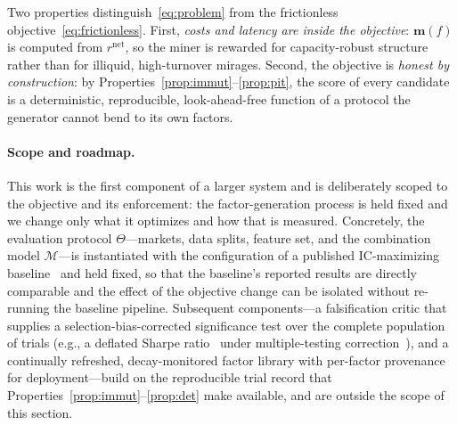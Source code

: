 \documentclass[11pt]{article}
\newcommand{\proto}{\Theta}
\newcommand{\combiner}{\mathcal{M}}
\begin{document}
Two properties distinguish~\eqref{eq:problem} from the frictionless
objective~\eqref{eq:frictionless}. First, \emph{costs and latency are inside the
objective}: $\bm{m}(f)$ is computed from $r^{\mathrm{net}}$, so the miner is rewarded for
capacity-robust structure rather than for illiquid, high-turnover mirages. Second, the
objective is \emph{honest by construction}: by Properties~\ref{prop:immut}--\ref{prop:pit},
the score of every candidate is a deterministic, reproducible, look-ahead-free function
of a protocol the generator cannot bend to its own factors.

\paragraph{Scope and roadmap.}
This work is the first component of a larger system and is deliberately scoped to the
objective and its enforcement: the factor-generation process is held fixed and we change
only what it optimizes and how that is measured. Concretely, the evaluation protocol
$\proto$---markets, data splits, feature set, and the combination model
$\combiner$---is instantiated with the configuration of a published IC-maximizing
baseline~\cite{han2026quantaalpha} and held fixed, so that the baseline's reported
results are directly comparable and the effect of the objective change can be isolated
without re-running the baseline pipeline. Subsequent components---a falsification critic that supplies a
selection-bias-corrected significance test over the complete population of trials
(e.g., a deflated Sharpe ratio~\cite{bailey2014dsr} under multiple-testing
correction~\cite{harvey2016cross}), and a
continually refreshed, decay-monitored factor library with per-factor provenance for
deployment---build on the reproducible trial record that
Properties~\ref{prop:immut}--\ref{prop:det} make available, and are outside the scope of
this section.
\end{document}
